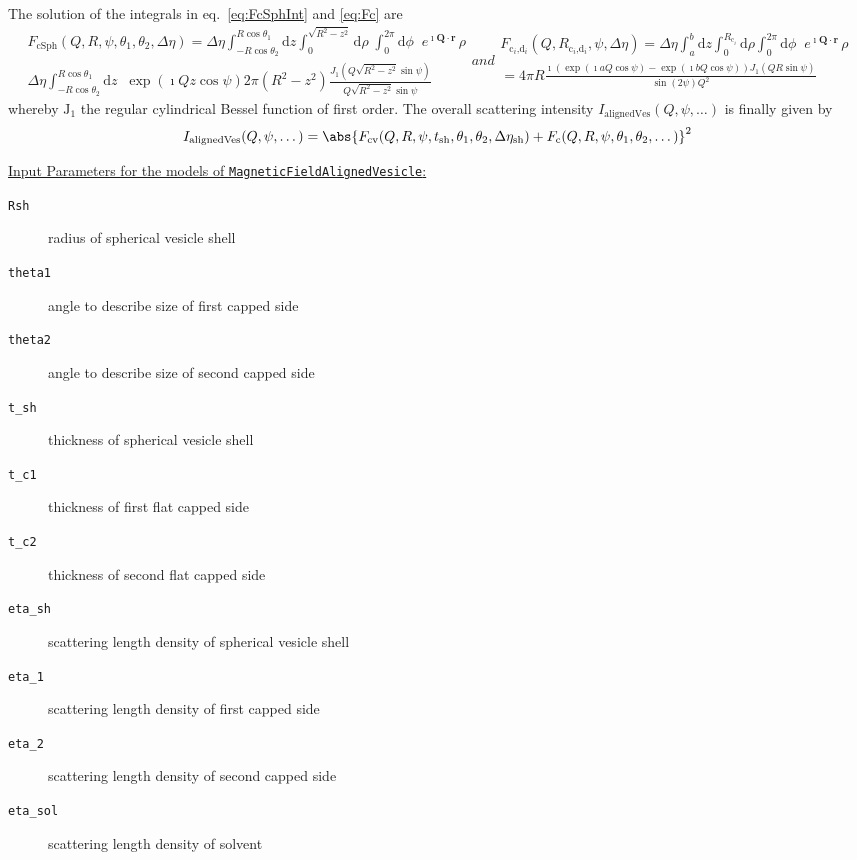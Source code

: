 The solution of the integrals in eq.\ \ref{eq:FcSphInt} and \ref{eq:Fc} are
\begin{subequations}
\begin{multline}
F_\text{cSph}(Q,R,\psi,\theta_1,\theta_2,\Delta\eta) = \Delta\eta \!\!
\int_{-R\cos\theta_2}^{R\cos\theta_1} \!\!\!\!\! \mathrm{d}z \!\!\!
\int_0^{\sqrt{R^2-z^2}}\!\!\!\!\! \mathrm{d}\rho \;
\int_0^{2\pi} \mathrm{d}\phi \;\; e^{\imath \mathbf{Q}\cdot\mathbf{r}}
\, \rho  \\
 \Delta\eta \!\!
\int_{-R\cos\theta_2}^{R\cos\theta_1} \!\!\!\!\! \mathrm{d}z\;\;
\exp\left(\imath Q z \cos\psi\right)  2\pi \left(R^2 - z^2\right)
\frac{J_1\left(Q \sqrt{R^2 - z^2} \sin\psi\right)}{Q \sqrt{R^2 - z^2} \sin\psi}
\label{eq:FcSphPsi}
\end{multline}
and
\begin{multline}
F_\textrm{c$_i$,d$_i$}(Q,R_\textrm{c$_i$,d$_i$},\psi,\Delta\eta)   =
\Delta\eta \int_{a}^{b}\!\! \mathrm{d}z
           \int_0^{R_\textrm{c$_i$}}\!\! \mathrm{d}\rho
           \int_0^{2\pi}\!\! \mathrm{d}\phi \;\; e^{\imath \mathbf{Q}\cdot\mathbf{r}}
\, \rho \\
 = 4 \pi R \frac{\imath \left(\exp\left(\imath a Q \cos\psi\right)-\exp\left(\imath b Q \cos\psi\right)\right)
 J_1\left(Q R \sin\psi\right)}{\sin\left(2\psi\right) Q^2}
\end{multline}
\end{subequations}
whereby $\mathrm{J}_1$ the regular cylindrical Bessel function of first order.
The overall scattering intensity $I_{\textrm{alignedVes}}(Q,\psi,\dots)$ is finally given by
\begin{align}
I_{\textrm{alignedVes}}(Q,\psi,\dots) =
\abs{
 F_\text{cv}(Q,R,\psi,t_\text{sh},\theta_1,\theta_2,\Delta\eta_\text{sh})
+F_\text{c}(Q,R,\psi,\theta_1,\theta_2,\dots)}^2
\end{align}
\vspace{5mm}
\begin{sloppypar}
\noindent \uline{Input Parameters for the models of \texttt{MagneticFieldAlignedVesicle}:}
\end{sloppypar}
\begin{description}
\item[\texttt{Rsh}] radius of spherical vesicle shell
\item[\texttt{theta1}] angle to describe size of first capped side
\item[\texttt{theta2}] angle to describe size of second capped side
\item[\texttt{t\_sh}] thickness of spherical vesicle shell
\item[\texttt{t\_c1}] thickness of first flat capped side
\item[\texttt{t\_c2}] thickness of second flat capped side
\item[\texttt{eta\_sh}] scattering length density of spherical vesicle shell
\item[\texttt{eta\_1}] scattering length density of first capped side
\item[\texttt{eta\_2}] scattering length density of second capped side
\item[\texttt{eta\_sol}] scattering length density of solvent
\end{description}

